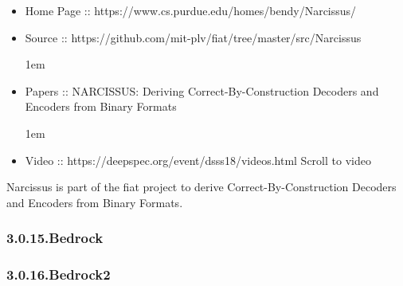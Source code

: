 \documentclass[12pt,twoside]{article}
\begin{document}
\begin{itemize}[noitemsep,topsep=\mdcompacttopsep]%

\item{}Home Page :: https://www.cs.purdue.edu/homes/bendy/Narcissus/%

\item{}Source :: https://github.com/mit-plv/fiat/tree/master/src/Narcissus
\begin{mdpre}%
\begin{mdbmarginx}{}{}{}{1em}%
\end{mdbmarginx}%
\end{mdpre}%

\item{}Papers :: NARCISSUS: Deriving Correct-By-Construction Decoders and Encoders from Binary Formats
\begin{mdpre}%
\begin{mdbmarginx}{}{}{}{1em}%
\end{mdbmarginx}%
\end{mdpre}%

\item{}Video :: https://deepspec.org/event/dsss18/videos.html Scroll to video%
\end{itemize}%

\noindent{}Narcissus is part of the fiat project to derive
Correct-By-Construction Decoders and Encoders from Binary Formats.%

\subsubsection{3.0.15.\hspace*{0.5em}Bedrock}\label{sec-bedrock}%

\subsubsection{3.0.16.\hspace*{0.5em}Bedrock2}\label{sec-bedrock2}%
\end{document}
